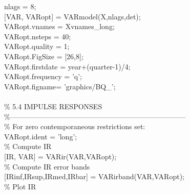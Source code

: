 \hspace{1mm}nlags = 8; \\ 
\hspace{1mm}[VAR, VARopt] = VARmodel(X,nlags,det); \\ 
\hspace{1mm}VARopt.vnames = Xvnames\_long; \\ 
\hspace{1mm}VARopt.nsteps = 40; \\ 
\hspace{1mm}VARopt.quality = 1; \\ 
\hspace{1mm}VARopt.FigSize = [26,8]; \\ 
\hspace{1mm}VARopt.firstdate = year+(quarter-1)/4; \\ 
\hspace{1mm}VARopt.frequency = \textcolor{matlabpurple}{'q'}; \\ 
\hspace{1mm}VARopt.figname= \textcolor{matlabpurple}{'graphics/BQ\_'}; \\ 
\hspace{1mm} \\ 
\hspace{1mm}\textcolor{matlabgreen}{\% 5.4 IMPULSE RESPONSES }\\ 
\hspace{1mm}\textcolor{matlabgreen}{\%--------------------------------------------------------------------------  }\\ 
\hspace{1mm}\textcolor{matlabgreen}{\% For zero contemporaneous restrictions set: }\\ 
\hspace{1mm}VARopt.ident = \textcolor{matlabpurple}{'long'}; \\ 
\hspace{1mm}\textcolor{matlabgreen}{\% Compute IR }\\ 
\hspace{1mm}[IR, VAR] = VARir(VAR,VARopt); \\ 
\hspace{1mm}\textcolor{matlabgreen}{\% Compute IR error bands }\\ 
\hspace{1mm}[IRinf,IRsup,IRmed,IRbar] = VARirband(VAR,VARopt); \\ 
\hspace{1mm}\textcolor{matlabgreen}{\% Plot IR }\\ 
